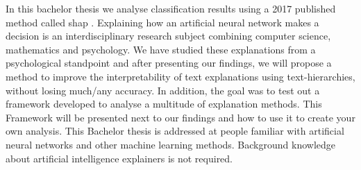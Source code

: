 
\Abstract
In this bachelor thesis we analyse classification results using a 2017 published method called shap \cite{shapPaper}. Explaining how an artificial neural network makes a decision is an interdisciplinary research subject combining computer science, mathematics and psychology. We have studied these explanations from a psychological standpoint and after presenting our findings, we will propose a method to improve the interpretability of text explanations using text-hierarchies, without losing much/any accuracy. In addition, the goal was to test out a framework developed to analyse a multitude of explanation methods. This Framework will be presented next to our findings and how to use it to create your own analysis. This Bachelor thesis is addressed at people familiar with artificial neural networks and other machine learning methods. Background knowledge about artificial intelligence explainers is not required.
